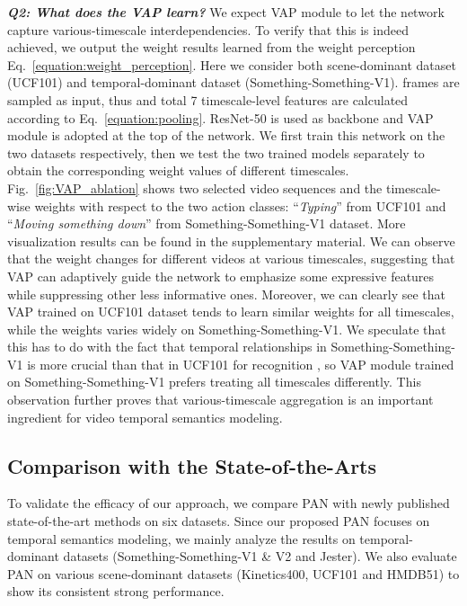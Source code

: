\documentclass[journal]{IEEEtran}
\begin{document}
\textbf{\emph{Q2: What does the VAP learn? }} We expect VAP module to let the network capture various-timescale interdependencies. To verify that this is indeed achieved, we output the weight results  learned from the weight perception Eq.~\ref{equation:weight_perception}. Here we consider both scene-dominant dataset (UCF101) and temporal-dominant dataset (Something-Something-V1).  frames are sampled as input, thus  and total 7 timescale-level features  are calculated according to Eq.~\ref{equation:pooling}. ResNet-50 is used as backbone and VAP module is adopted at the top of the network. We first train this network on the two datasets respectively, then we test the two trained models separately to obtain the corresponding weight values  of different timescales. Fig.~\ref{fig:VAP_ablation} shows two selected video sequences and the timescale-wise weights  with respect to the two action classes: ``\emph{Typing}'' from UCF101 and ``\emph{Moving something down}'' from Something-Something-V1 dataset. More visualization results can be found in the supplementary material. We can observe that the weight changes for different videos at various timescales, suggesting that VAP can adaptively guide the network to emphasize some expressive features while suppressing other less informative ones. Moreover, we can clearly see that VAP trained on UCF101 dataset tends to learn similar weights for all timescales, while the weights varies widely on Something-Something-V1. We speculate that this has to do with the fact that temporal relationships in Something-Something-V1 is more crucial than that in UCF101 for recognition \cite{zhou2018temporal,lin2019tsm,Xie2018RethinkingSF}, so VAP module trained on Something-Something-V1 prefers treating all timescales differently. This observation further proves that various-timescale aggregation is an important ingredient for video temporal semantics modeling.






\subsection{Comparison with the State-of-the-Arts}

To validate the efficacy of our approach, we compare PAN with newly published state-of-the-art methods on six datasets. Since our proposed PAN focuses on temporal semantics modeling, we mainly analyze the results on temporal-dominant datasets (Something-Something-V1 \& V2 and Jester). We also evaluate PAN on various scene-dominant datasets (Kinetics400, UCF101 and HMDB51) to show its consistent strong performance.
\end{document}
